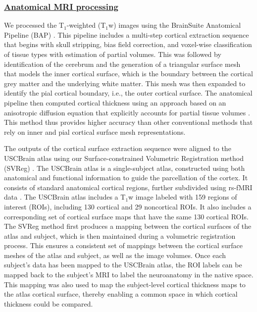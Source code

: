 \documentclass[review,3p,times,12pt,letterpaper]{elsarticle}
\begin{document}
\subsubsection*{\normalfont\underline{Anatomical MRI processing}}
We processed the T$_1$-weighted (T$_1$w) images using the BrainSuite Anatomical Pipeline (BAP)  \cite{shattuck_brainsuite_2002}. This pipeline includes a multi-step cortical extraction sequence that begins with  skull stripping, bias field correction, and voxel-wise classification of tissue types with estimation of partial volumes. This was followed by identification of the cerebrum and the generation of a triangular surface mesh that models the inner cortical surface, which is the boundary between the cortical grey matter and the underlying white matter. This mesh was then expanded to identify the pial cortical boundary, i.e., the outer cortical surface.
The anatomical pipeline then computed cortical thickness using an approach based on an anisotropic diffusion equation that explicitly accounts for partial tissue volumes \cite{joshi2018using}. This method thus provides higher accuracy than other conventional methods that rely on inner and pial cortical surface mesh representations.

The outputs of the cortical surface extraction sequence were aligned to the USCBrain atlas \cite{joshi2022hybrid} using our Surface-constrained Volumetric Registration method (SVReg) \cite{joshi_method_2012}. 
The USCBrain atlas is a single-subject atlas, constructed using both anatomical and functional information to guide the parcellation of the cortex. It consists of standard anatomical cortical regions, further subdivided using rs-fMRI data \cite{joshi2022hybrid}. The USCBrain atlas includes a T$_1$w image labeled with 159 regions of interest (ROIs), including 130 cortical and 29 noncortical ROIs. It also includes a corresponding set of cortical surface maps that have the same 130 cortical ROIs. 
The SVReg method first produces a mapping between the cortical surfaces of the atlas and subject, which is then maintained during a volumetric registration process. This ensures a consistent set of mappings between the cortical surface meshes of the atlas and subject, as well as the image volumes.  Once each subject's data has been mapped to the USCBrain atlas, the ROI labels can be mapped back to the subject's MRI to label the neuroanatomy in the native space. This mapping was also used to map the subject-level cortical thickness maps to the atlas cortical surface, thereby enabling a common space in which cortical thickness could be compared.
\end{document}
